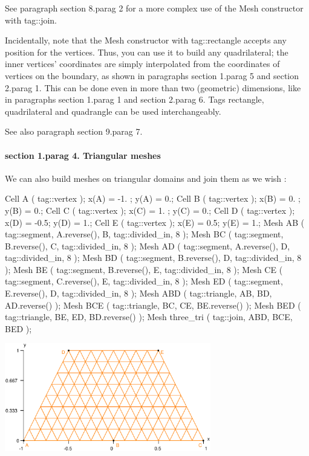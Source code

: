 See paragraph \numb section 8.\numb parag 2 for a more complex use of the {\codett Mesh}
constructor with {\codett tag::join}.

Incidentally, note that the {\codett Mesh} constructor with {\codett tag::rectangle} accepts
any position for the vertices. 
Thus, you can use it to build any quadrilateral; the inner vertices' coordinates are simply
interpolated from the coordinates of vertices on the boundary, as shown in paragraphs
\numb section 1.\numb parag 5 and \numb section 2.\numb parag 1.
This can be done even in more than two (geometric) dimensions,
like in paragraphs \numb section 1.\numb parag 1 and \numb section 2.\numb parag 6.
Tags {\codett rectangle}, {\codett quadrilateral} and {\codett quadrangle} can be used
interchangeably.

See also paragraph \numb section 9.\numb parag 7.


\paragraph{\numb section 1.\numb parag 4. Triangular meshes}

We can also build meshes on triangular domains and {\codett join} them as we wish :

\verbatim
   Cell A ( tag::vertex );  x(A) = -1. ;  y(A) = 0.;
   Cell B ( tag::vertex );  x(B) =  0. ;  y(B) = 0.;
   Cell C ( tag::vertex );  x(C) =  1. ;  y(C) = 0.;
   Cell D ( tag::vertex );  x(D) = -0.5;  y(D) = 1.;
   Cell E ( tag::vertex );  x(E) =  0.5;  y(E) = 1.;
   Mesh AB ( tag::segment, A.reverse(), B, tag::divided_in, 8 );
   Mesh BC ( tag::segment, B.reverse(), C, tag::divided_in, 8 );
   Mesh AD ( tag::segment, A.reverse(), D, tag::divided_in, 8 );
   Mesh BD ( tag::segment, B.reverse(), D, tag::divided_in, 8 );
   Mesh BE ( tag::segment, B.reverse(), E, tag::divided_in, 8 );
   Mesh CE ( tag::segment, C.reverse(), E, tag::divided_in, 8 );
   Mesh ED ( tag::segment, E.reverse(), D, tag::divided_in, 8 );
   Mesh ABD ( tag::triangle, AB, BD, AD.reverse() );
   Mesh BCE ( tag::triangle, BC, CE, BE.reverse() );
   Mesh BED ( tag::triangle, BE, ED, BD.reverse() );
   Mesh three_tri ( tag::join, ABD, BCE, BED );
\endverbatim

{ 
\centerline{\includegraphics[width=9cm]{three-tri.eps}} }
\vfil\eject


